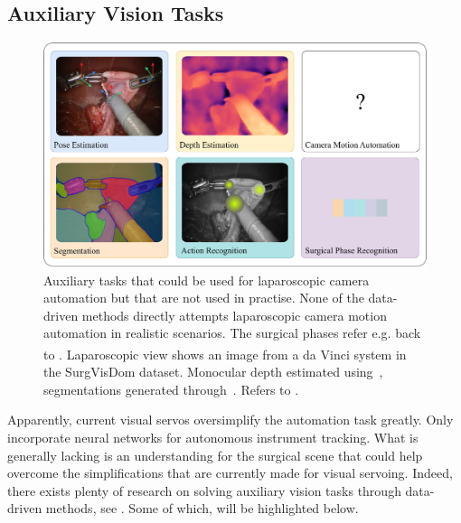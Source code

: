\subsection{Auxiliary Vision Tasks}
\label{in:sec:auxiliary_tasks}
\begin{figure}[tb]
    \centering
    \includegraphics[width=\textwidth]{introduction/fig/auxiliary_tasks.pdf}
    \caption{Auxiliary tasks that could be used for laparoscopic camera automation but that are not used in practise. None of the data-driven methods directly attempts laparoscopic camera motion automation in realistic scenarios. The surgical phases refer e.g. back to . Laparoscopic view shows an image from a da Vinci\textsuperscript{\textregistered} system in the SurgVisDom\cite{zia2021surgical} dataset. Monocular depth estimated using~\cite{oquab2023dinov2}, segmentations generated through~\cite{segment_anything}. Refers to .}
    \label{in:fig:auxiliary_tasks}
\end{figure}
Apparently, current visual servos oversimplify the automation task greatly. Only~\cite{gruijthuijsen2021autonomous} incorporate neural networks for autonomous instrument tracking. What is generally lacking is an understanding for the surgical scene that could help overcome the simplifications that are currently made for visual servoing. Indeed, there exists plenty of research on solving auxiliary vision tasks through data-driven methods, see . Some of which, will be highlighted below. 

